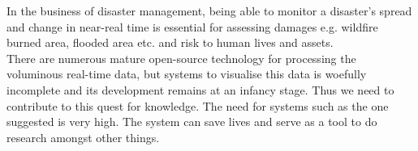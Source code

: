 In the business of disaster management, being able to monitor a disaster's spread and change in near-real time is essential for assessing damages e.g. wildfire burned area, flooded area etc. and risk to human lives and assets.\\
There are numerous mature open-source technology for processing the voluminous real-time data, but systems to visualise this data is woefully incomplete and its development remains at an infancy stage. Thus we need to contribute to this quest for knowledge. The need for systems such as the one suggested is very high. The system can save lives and serve as a tool to do research amongst other things.